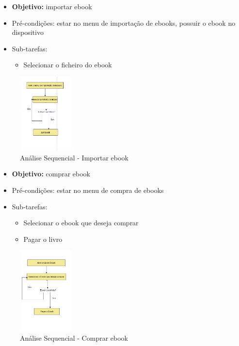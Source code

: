 \documentclass[11pt]{article}
\begin{document}
	\begin{itemize}
		\item \textbf{Objetivo:} importar ebook
		\item Pré-condições: estar no menu de importação de ebooks, possuir o ebook no dispositivo
		\item Sub-tarefas:
		\begin{itemize}
			\item Selecionar o ficheiro do ebook
		\end{itemize}
	\end{itemize}

	\begin{figure}[H]
		\includegraphics[width=0.25\textwidth,height=0.88\textheight,keepaspectratio]{tarefa-importar-ebook}
		\centering
		\caption{Análise Sequencial - Importar ebook}
		\label{fig:as-importarEbooks}
	\end{figure}

	\begin{itemize}
		\item \textbf{Objetivo:} comprar ebook
		\item Pré-condições: estar no menu de compra de ebooks
		\item Sub-tarefas:
		\begin{itemize}
			\item Selecionar o ebook que deseja comprar
			\item Pagar o livro
		\end{itemize}
	\end{itemize}

	\begin{figure}[H]
		\includegraphics[width=0.25\textwidth,height=0.88\textheight,keepaspectratio]{tarefa-comprar-ebook}
		\centering
		\caption{Análise Sequencial - Comprar ebook}
		\label{fig:as-comprarEbook}
	\end{figure}
	
\end{document}
